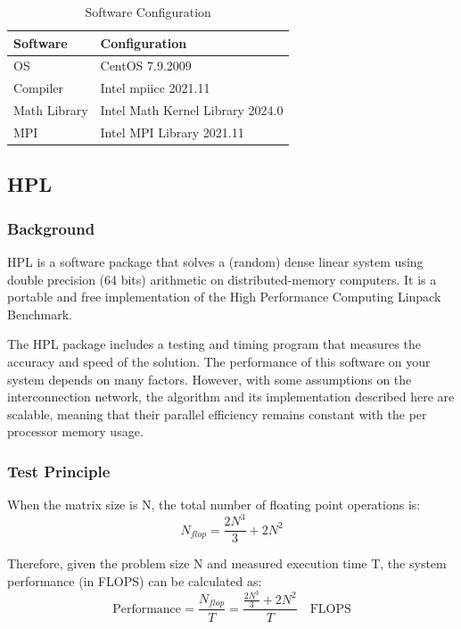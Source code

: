 \documentclass[a4paper,12pt]{article}
\begin{document}
\begin{table}[H]
\centering
\vspace{0.5cm}
\begin{tabular}{ll}
\toprule
Software & Configuration \\
\midrule
OS & CentOS 7.9.2009 \\
Compiler & Intel mpiicc 2021.11 \\
Math Library & Intel Math Kernel Library 2024.0 \\
MPI & Intel MPI Library 2021.11 \\
\bottomrule
\end{tabular}
\caption{Software Configuration}
\end{table}

\subsection{HPL}

\subsubsection{Background}

HPL is a software package that solves a (random) dense linear system using double precision (64 bits) arithmetic on distributed-memory computers. It is a portable and free implementation of the High Performance Computing Linpack Benchmark.

The HPL package includes a testing and timing program that measures the accuracy and speed of the solution. The performance of this software on your system depends on many factors. However, with some assumptions on the interconnection network, the algorithm and its implementation described here are scalable, meaning that their parallel efficiency remains constant with the per processor memory usage.

\subsubsection{Test Principle}

When the matrix size is N, the total number of floating point operations is:
\begin{equation}
    \boxed{N_{flop} = \frac{2N^3}{3} + 2N^2}
\end{equation}

Therefore, given the problem size N and measured execution time T, the system performance (in FLOPS) can be calculated as:
\begin{equation}
    \text{Performance} = \frac{N_{flop}}{T} = \frac{\frac{2N^3}{3} + 2N^2}{T} \quad \text{FLOPS}
\end{equation}
\end{document}
